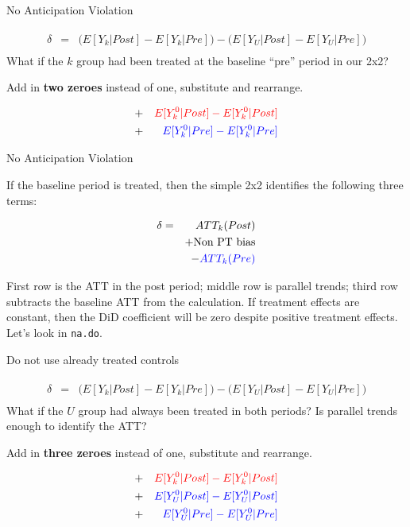 \documentclass{beamer}
\begin{document}
\begin{frame}{No Anticipation Violation}


\begin{eqnarray*}
\widehat{\delta} &=& \bigg ( E[Y_k|Post] - E[Y_k|Pre] \bigg ) - \bigg ( E[Y_U | Post ] - E[ Y_U | Pre] \bigg) \\
\end{eqnarray*}What if the $k$ group had been treated at the baseline ``pre'' period in our 2x2?  

\bigskip

Add in \textbf{two zeroes} instead of one, substitute and rearrange.

\begin{eqnarray*}
&+& \textcolor{red}{E[Y^0_k|Post] - E[Y^0_k|Post]} \\
&+& \textcolor{blue}{E[Y^0_k|Pre] - E[Y^0_k|Pre]} 
\end{eqnarray*}

\end{frame}

\begin{frame}{No Anticipation Violation}

If the baseline period is treated, then the simple 2x2 identifies the following three terms:

\begin{eqnarray*}
\delta &=& ATT_k(Post) \\&&+ \text{Non PT bias} \\&&- \textcolor{blue}{ATT_k(Pre)}
\end{eqnarray*}

First row is the ATT in the post period; middle row is parallel trends; third row subtracts the baseline ATT from the calculation. If treatment effects are constant, then the DiD coefficient will be zero despite positive treatment effects.  Let's look in \texttt{na.do}.

\end{frame}

\begin{frame}{Do not use already treated controls}


\begin{eqnarray*}
\widehat{\delta} &=& \bigg ( E[Y_k|Post] - E[Y_k|Pre] \bigg ) - \bigg ( E[Y_U | Post ] - E[ Y_U | Pre] \bigg) \\
\end{eqnarray*}What if the $U$ group had always been treated in both periods? Is parallel trends enough to identify the ATT?

\bigskip

Add in \textbf{three zeroes} instead of one, substitute and rearrange.

\begin{eqnarray*}
&+& \textcolor{red}{E[Y^0_k|Post] - E[Y^0_k|Post]} \\
&+& \textcolor{blue}{E[Y^0_U|Post] - E[Y^0_U|Post]}  \\
&+& \textcolor{blue}{E[Y^0_U|Pre] - E[Y^0_U|Pre]} 
\end{eqnarray*}

\end{frame}
\end{document}
